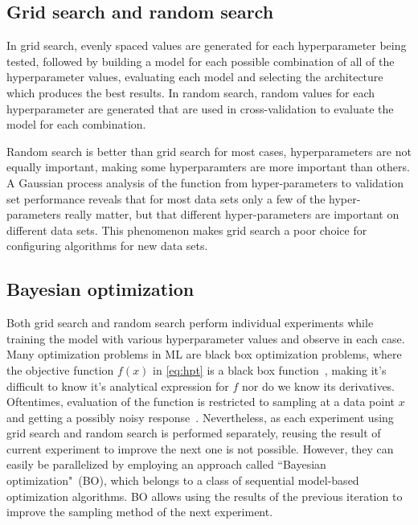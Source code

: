 \subsection{Grid search and random search}
In grid search, evenly spaced values are generated for each hyperparameter being tested, followed by building a model for each possible combination of all of the hyperparameter values, evaluating each model and selecting the architecture which produces the best results. %
In random search, random values for each hyperparameter are generated that are used in cross-validation to evaluate the model for each combination.

\hspace*{3.5mm} Random search is better than grid search for most cases, hyperparameters are not equally important, making some hyperparamters are more important than others. A Gaussian process analysis of the function from hyper-parameters to validation set performance reveals that for most data sets only a few of the hyper-parameters really matter, but that different hyper-parameters are important on different data sets. This phenomenon makes grid search a poor choice for configuring algorithms for new data sets. %

\subsection{Bayesian optimization} 
Both grid search and random search perform individual experiments while training the model with various hyperparameter values and observe in each case. Many optimization problems in ML are black box optimization problems, where the objective function $f(x)$ in \cref{eq:hpt} is a black box function~\cite{BO}, making it's difficult to know it's analytical expression for $f$ nor do we know its derivatives. Oftentimes, evaluation of the function is restricted to sampling at a data point $x$ and getting a possibly noisy response~\cite{BO}.
Nevertheless, as each experiment using grid search and random search is performed separately, reusing the result of current experiment to improve the next one is not possible. However, they can easily be parallelized by employing an approach called ``Bayesian optimization"~(BO), which belongs to a class of sequential model-based optimization algorithms. BO allows using the results of the previous iteration to improve the sampling method of the next experiment.

